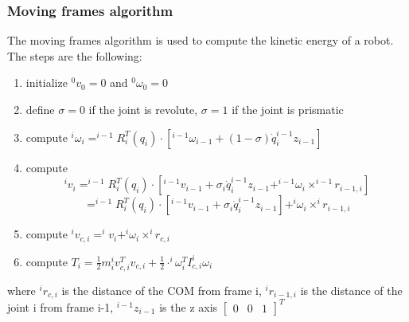 \documentclass[a4paper,12pt]{article}
\begin{document}
\subsubsection{Moving frames algorithm}
The moving frames algorithm is used to compute the kinetic energy of a robot.
The steps are the following:
\begin{enumerate}
    \item initialize $^0v_0 = 0$ and $^0\omega_0 = 0$
    \item define $\sigma = 0$ if the joint is revolute, $\sigma = 1$ if the joint is prismatic
    \item compute $^i\omega_i = ^{i-1}R_i^T(q_i) \cdot[^{i-1}\omega_{i-1} + (1-\sigma)\dot{q}_i ^{i-1}z_{i-1}]$
    \item compute \begin{equation} 
        ^i v_i = ^{i-1}R_i^T(q_i) \cdot[^{i-1}v_{i-1} + \sigma_i\dot{q}_i ^{i-1}z_{i-1} + ^{i-1}\omega_i \times ^{i-1}r_{i-1,i}]
    \end{equation}
    \begin{equation}
    =^{i-1}R_i^T(q_i) \cdot[^{i-1}v_{i-1} + \sigma_i\dot{q}_i ^{i-1}z_{i-1}] + ^i\omega_i \times ^ir_{i-1,i} 
\end{equation}
    \item compute $^i v_{c,i} = ^i v_i + ^i\omega_i \times ^i r_{c,i}$
    \item compute $T_i = \frac{1}{2} m_i ^i v_{c,i}^{T}v_{c,i} + \frac{1}{2}\cdot ^i\omega_i^T I_{c,i} ^i\omega_i$
\end{enumerate}
where $^i r_{c,i}$ is the distance of the COM from frame i,
$^i r_{i-1,i}$ is the distance of the joint i from frame i-1,
$^{i-1}z_{i-1}$ is the z axis $\begin{bmatrix} 0 & 0 & 1 \end{bmatrix}^T$
\end{document}
